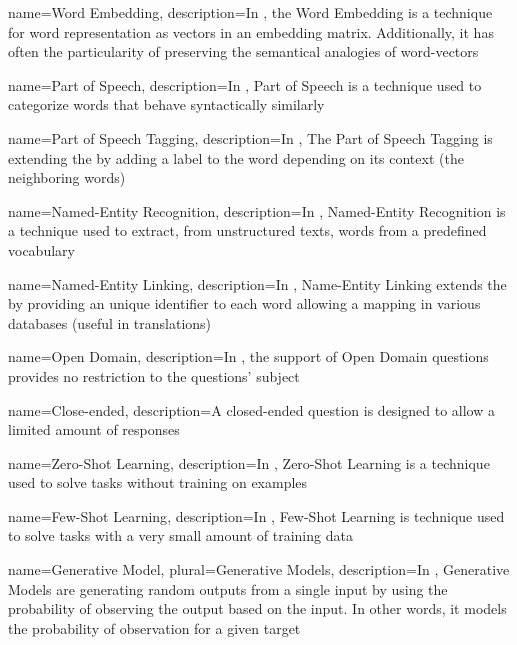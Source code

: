 {
  name={Word Embedding},
  description={In , the Word Embedding is a technique for word representation as vectors in an embedding matrix. Additionally, it has often the particularity of preserving the semantical analogies of word-vectors}
}

{
  name={Part of Speech},
  description={In , Part of Speech is a technique used to categorize words that behave syntactically similarly}
}

{
  name={Part of Speech Tagging},
  description={In , The Part of Speech Tagging is extending the  by adding a label to the word depending on its context (the neighboring words)}
}


{
  name={Named-Entity Recognition},
  description={In , Named-Entity Recognition is a technique used to extract, from unstructured texts, words from a predefined vocabulary}
}

{
  name={Named-Entity Linking},
  description={In , Name-Entity Linking extends the  by providing an unique identifier to each word allowing a mapping in various databases (useful in translations)}
}

{
  name={Open Domain},
  description={In , the support of Open Domain questions provides no restriction to the questions' subject}
}

{
  name={Close-ended},
  description={A closed-ended question is designed to allow a limited amount of responses}
}

{
  name={Zero-Shot Learning},
  description={In , Zero-Shot Learning is a technique used to solve tasks without training on examples}
}

{
  name={Few-Shot Learning},
  description={In , Few-Shot Learning is technique used to solve tasks with a very small amount of training data}
}

{
  name={Generative Model},
  plural={Generative Models},
  description={In , Generative Models are generating random outputs from a single input by using the probability of observing the output based on the input. In other words, it models the probability of observation for a given target}
}

